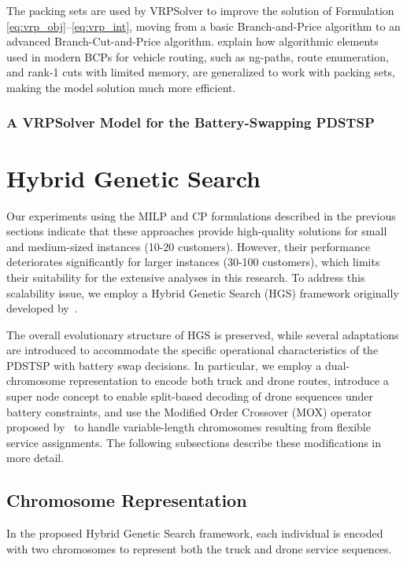 \documentclass[3p, authoryear, 11pt]{elsarticle}
\begin{document}
The packing sets are used by VRPSolver to improve the solution of Formulation \eqref{eq:vrp_obj}--\eqref{eq:vrp_int}, moving from a basic Branch-and-Price algorithm to an advanced Branch-Cut-and-Price algorithm. \citet{pessoa_generic_2020} explain how algorithmic elements used in modern BCPs for vehicle routing, such as ng-paths, route enumeration, and rank-1 cuts with limited memory, are generalized to work with packing sets, making the model solution much more efficient.

\subsubsection{A VRPSolver Model for the Battery-Swapping PDSTSP}



\section{Hybrid Genetic Search}
\label{sec:hgs}

Our experiments using the MILP and CP formulations described in the previous sections indicate that these approaches provide high-quality solutions for small and medium-sized instances (10-20 customers). However, their performance deteriorates significantly for larger instances (30-100 customers), which limits their suitability for the extensive analyses in this research. To address this scalability issue, we employ a Hybrid Genetic Search (HGS) framework originally developed by~\cite{vidal_hybrid_2013, vidal_hgs_2022}.

The overall evolutionary structure of HGS is preserved, while several adaptations are introduced to accommodate the specific operational characteristics of the PDSTSP with battery swap decisions. 
In particular, we employ a dual-chromosome representation to encode both truck and drone routes, introduce a super node concept to enable split-based decoding of drone sequences under battery constraints, and use the Modified Order Crossover (MOX) operator proposed by~\citet{pham_solving_2017} to handle variable-length chromosomes resulting from flexible service assignments. 
The following subsections describe these modifications in more detail.

\subsection{Chromosome Representation}

In the proposed Hybrid Genetic Search framework, each individual is encoded with two chromosomes to represent both the truck and drone service sequences.
\end{document}
